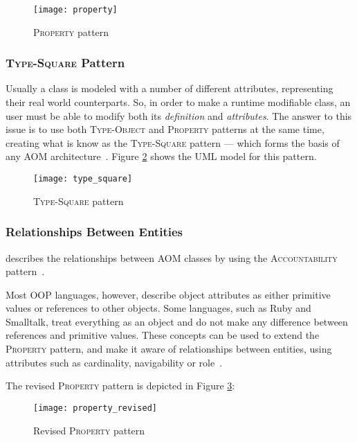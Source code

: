\begin{figure}[H]
  \centering
  \texttt{[image: property]}
  \caption{\textsc{Property} pattern}
  \label{fig:property_pattern}
\end{figure}

\subsubsection{\textsc{Type-Square} Pattern}\label{sec:type-square_pattern}

Usually a class is modeled with a number of different attributes, representing their real world counterparts. So, in order to make a runtime modifiable class, an user must be able to modify both its \emph{definition} and \emph{attributes}. The answer to this issue is to use both \textsc{Type-Object} and \textsc{Property} patterns at the same time, creating what is know as the \textsc{Type-Square} pattern --- which forms the basis of any AOM architecture~\cite{YJ02}. Figure \ref{fig:type_square} shows the UML model for this pattern.

\begin{figure}[H]
  \centering
  \texttt{[image: type\_square]}
  \caption{\textsc{Type-Square} pattern}
  \label{fig:type_square}
\end{figure}

\subsubsection{Relationships Between Entities}\label{sec:relationships_between_entities}

\cite{YJ02} describes the relationships between AOM classes by using the \textsc{Accountability} pattern~\cite{fowler, hay}.

Most OOP languages, however, describe object attributes as either primitive values or references to other objects. Some languages, such as Ruby and Smalltalk, treat everything as an object and do not make any difference between references and primitive values. These concepts can be used to extend the \textsc{Property} pattern, and make it aware of relationships between entities, using attributes such as cardinality, navigability or role~\cite{aom_research_roadmap}.

The revised \textsc{Property} pattern is depicted in Figure \ref{fig:property_revised}:

\begin{figure}[H]
  \centering
  \texttt{[image: property\_revised]}
  \caption{Revised \textsc{Property} pattern}
  \label{fig:property_revised}
\end{figure}

